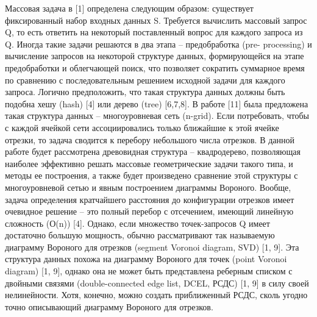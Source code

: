 Массовая задача в [1] определена следующим образом: существует
фиксированный набор входных данных S. Требуется вычислить массовый
запрос Q, то есть ответить на некоторый поставленный вопрос для каждого
запроса из Q. Иногда такие задачи решаются в два этапа – предобработка (pre-
processing) и вычисление запросов на некоторой структуре данных,
формирующейся на этапе предобработки и облегчающей поиск, что позволяет
сократить суммарное время по сравнению с последовательным решением
исходной задачи для каждого запроса.
Логично предположить, что такая структура данных должны быть
подобна хешу (hash) [4] или дерево (tree) [6,7,8]. В работе [11] была предложена
такая структура данных – многоуровневая сеть (n-grid). Если потребовать,
чтобы с каждой ячейкой сети ассоциировались только ближайшие к этой
ячейке отрезки, то задача сводится к перебору небольшого числа отрезков. В
данной работе будет рассмотрена древовидная структура – квадродерево,
позволяющая наиболее эффективно решать массовые геометрические задачи
такого типа, и методы ее построения, а также будет произведено сравнение
этой структуры с многоуровневой сетью и явным построением диаграммы
Вороного.
Вообще, задача определения кратчайшего расстояния до конфигурации
отрезков имеет очевидное решение – это полный
перебор с отсечением, имеющий линейную сложность (О(n)) [4]. Однако, если
множество точек-запросов Q имеет достаточно большую мощность, обычно
рассматривают так называемую диаграмму Вороного для отрезков (segment
Voronoi diagram, SVD) [1, 9]. Эта структура данных похожа на диаграмму
Вороного для точек (point Voronoi diagram) [1, 9], однако она не может быть
представлена реберным списком с двойными связями (double-connected edge
list, DCEL, РСДС) [1, 9] в силу своей нелинейности. Хотя, конечно, можно
создать приближенный РСДС, сколь угодно точно описывающий диаграмму
Вороного для отрезков.
